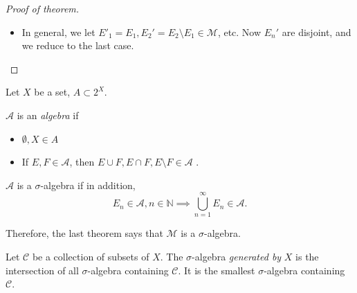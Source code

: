 \begin{proof}[Proof of theorem]
\begin{itemize}
\begin{itemize}
					Now take $A = \bigcup_{n = 1} ^\infty E_n$ :
					\begin{align*}
						m^*\left( \bigcup_{n = 1} ^\infty E_n \right) &\ge \sum_{n=1}^{\infty} m^*(A \cap E_n) + 0 \\
						&=\sum_{n=1}^{\infty} m^*(E_n) + 0 
					.\end{align*}
					The other direction comes from subadditivity.
				\item In general, we let $E'_1 = E_1, E_2' = E_2\setminus E_1 \in \mathcal{M}$, etc. Now $E_n'$ are disjoint, and we reduce to the last case.
			\end{itemize}
	\end{itemize}
	
\end{proof}


\begin{definition}
	Let $X$ be a set, $A \subset 2^X$.

	$\mathcal{A}$ is an \textit{algebra} if 
	\begin{itemize}
		\item $\emptyset , X \in A$
		\item If $E, F \in \mathcal{A}$, then $E \cup F, E \cap F, E \setminus F \in \mathcal{A}$ .
	\end{itemize}

	$\mathcal{A}$ is a $\sigma$-algebra if in addition,
	\[
		E_n \in \mathcal{A}, n \in \mathbb{N} \implies \bigcup_{n = 1} ^\infty  E_n \in \mathcal{A}
	.\] 
\end{definition}

Therefore, the last theorem says that $\mathcal{M}$ is a $\sigma$-algebra.

\begin{definition}
	Let $\mathcal{C}$ be a collection of subsets of $X$. The $\sigma$-algebra \textit{generated by} $X$ is the intersection of all $\sigma$-algebra containing $\mathcal{C}$. It is the smallest $\sigma$-algebra containing $\mathcal{C}$. 
\end{definition}

